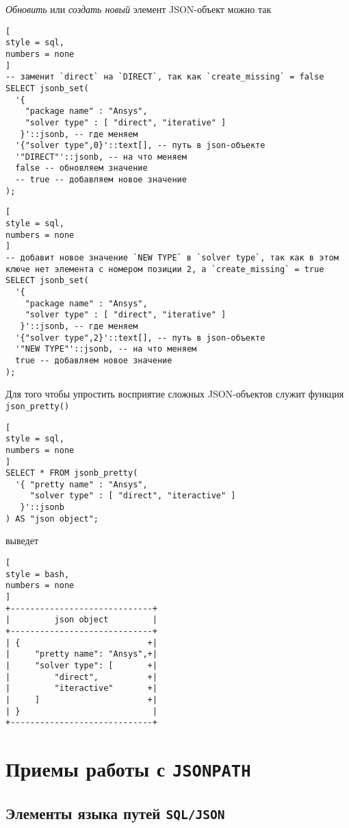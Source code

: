 \documentclass[%
	11pt,
	a4paper,
	utf8,
		]{article}
\begin{document}
\emph{Обновить} или \emph{создать новый} элемент JSON-объект можно так

\begin{lstlisting}[
style = sql, 
numbers = none
]
-- заменит `direct` на `DIRECT`, так как `create_missing` = false
SELECT jsonb_set(
  '{
    "package name" : "Ansys",
    "solver type" : [ "direct", "iterative" ]
   }'::jsonb, -- где меняем
  '{"solver type",0}'::text[], -- путь в json-объекте
  '"DIRECT"'::jsonb, -- на что меняем
  false -- обновляем значение
  -- true -- добавляем новое значение
);
\end{lstlisting}

\begin{lstlisting}[
style = sql, 
numbers = none
]
-- добавит новое значение `NEW TYPE` в `solver type`, так как в этом ключе нет элемента с номером позиции 2, а `create_missing` = true
SELECT jsonb_set(
  '{
    "package name" : "Ansys",
    "solver type" : [ "direct", "iterative" ]
   }'::jsonb, -- где меняем
  '{"solver type",2}'::text[], -- путь в json-объекте
  '"NEW TYPE"'::jsonb, -- на что меняем
  true -- добавляем новое значение
);
\end{lstlisting}

Для того чтобы упростить восприятие сложных JSON-объектов служит функция \texttt{json\_pretty()}
\begin{lstlisting}[
style = sql, 
numbers = none
]
SELECT * FROM jsonb_pretty(
  '{ "pretty name" : "Ansys",
     "solver type" : [ "direct", "iteractive" ]
   }'::jsonb
) AS "json object";
\end{lstlisting}
выведет
\begin{lstlisting}[
style = bash,
numbers = none
]
+-----------------------------+
|         json object         |
+-----------------------------+
| {                          +|
|     "pretty name": "Ansys",+|
|     "solver type": [       +|
|         "direct",          +|
|         "iteractive"       +|
|     ]                      +|
| }                           |
+-----------------------------+
\end{lstlisting}




\section{Приемы работы с \texttt{JSONPATH}}

\subsection{Элементы языка путей \texttt{SQL/JSON}}
\end{document}
